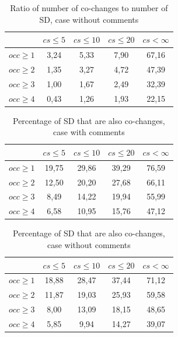 \documentclass[12pt, a4paper, twoside]{report}
\begin{document}
\begin{table}[!h]
\renewcommand{\arraystretch}{1}
\caption{Ratio of number of co-changes to number of SD, case without comments}
\label{tab:ratio:nocomm}
\centering

\begin{tabular}{|c|c|c|c|c|}
\hline
	      &	$cs\leq 5$	&	$cs\leq 10$	&	$cs\leq 20$	&	$cs< \infty$	\\
\hline
$occ\geq 1$	&	3,24	&	5,33	&	7,90	&	67,16	\\
$occ\geq 2$	&	1,35	&	3,27	&	4,72	&	47,39	\\
$occ\geq 3$	&	1,00	&	1,67	&	2,49	&	32,39	\\
$occ\geq 4$	&	0,43	&	1,26	&	1,93	&	22,15	\\
\hline
\end{tabular}
\end{table}

\begin{table}[!h]
\renewcommand{\arraystretch}{1}
\caption{Percentage of SD that are also co-changes, case with comments}
\label{tab:percSD:comm}
\centering

\begin{tabular}{|c|c|c|c|c|}
\hline
	      &	$cs\leq 5$	&	$cs\leq 10$	&	$cs\leq 20$	&	$cs< \infty$	\\
\hline
$occ\geq 1$	&	19,75	&	29,86	&	39,29	&	76,59	\\
$occ\geq 2$	&	12,50	&	20,20	&	27,68	&	66,11	\\
$occ\geq 3$	&	8,49	&	14,22	&	19,94	&	55,99	\\
$occ\geq 4$	&	6,58	&	10,95	&	15,76	&	47,12	\\
\hline
\end{tabular}
\end{table}

\begin{table}[!h]
\renewcommand{\arraystretch}{1}
\caption{Percentage of SD that are also co-changes, case without comments}
\label{tab:percSD:nocomm}
\centering

\begin{tabular}{|c|c|c|c|c|}
\hline
	      &	$cs\leq 5$	&	$cs\leq 10$	&	$cs\leq 20$	&	$cs< \infty$	\\
\hline
$occ\geq 1$	&	18,88	&	28,47	&	37,44	&	71,12	\\
$occ\geq 2$	&	11,87	&	19,03	&	25,93	&	59,58	\\
$occ\geq 3$	&	8,00	&	13,09	&	18,15	&	48,65	\\
$occ\geq 4$	&	5,85	&	9,94	&	14,27	&	39,07	\\
\hline
\end{tabular}
\end{table}
\end{document}
